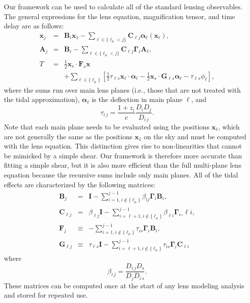 \documentclass{emulateapj}
\newcommand\A[0]{\mathbf{A}}
\newcommand\B[0]{\mathbf{B}}
\newcommand\C[0]{\mathbf{C}}
\newcommand\I[0]{\mathbf{I}}
\newcommand\F[0]{\mathbf{F}}
\newcommand\G[0]{\mathbf{G}}
\newcommand\GammaMat[0]{\boldsymbol{\Gamma}}
\newcommand\x[0]{\mathbf{x}}
\newcommand\al[0]{\boldsymbol{\alpha}}
\begin{document}
Our framework can be used to calculate all of the standard lensing observables. The general expressions for the lens equation, magnification tensor, and time delay are as follows:
\begin{eqnarray}
\x_{j} &=& \B_i \x_1 - \sum_{\ell \in \{\ell_\mu<j\}} \C_{\ell j} \al_\ell(\x_\ell), \label{eqn:lenseqn}\\
\A_{j} &=& \B_i - \sum_{\ell \in \{\ell_\mu<j\}} \C_{\ell j} \GammaMat_\ell \A_\ell, \\
T &=& \frac{1}{2} \x_s \cdot \F_s \x \nonumber \\
&&+ \sum\limits_{\ell \in \{\ell_\mu\}}\left[\frac{1}{2}\tau_{\ell s} \x_\ell \cdot \al_\ell -\frac{1}{2}\x_s \cdot \G_{\ell s}\al_\ell -\tau_{\ell s}\phi_\ell \right],
\end{eqnarray}
where the sums run over main lens planes (i.e., those that are not treated with the tidal approximation), $\al_\ell$ is the deflection in main plane $\ell$, and  
\begin{equation}
\tau_{i\,j} = \frac{ 1 + z_i}{c} \frac{D_i D_j}{D_{i\,j}}.
\end{equation}
Note that each main plane needs to be evaluated using the positions $\x_\ell$, which are not generally the same as the positions $\x_1$ on the sky and must be computed with the lens equation. This distinction gives rise to non-linearities that cannot be mimicked by a simple shear. Our framework is therefore more accurate than fitting a simple shear, but it is also more efficient than the full multi-plane lens equation because the recursive sums include only main planes.  All of the tidal effects are characterized by the following matrices:
\begin{eqnarray}
\B_j &=& \I - \sum\limits_{i=1,i\not \in \{\ell_\mu\}}^{j-1}\beta_{ij}\GammaMat_i \B_i, \\
\C_{\ell j} &=& \beta_{\ell j} \I - \sum\limits_{i=\ell+1, i\not\in\{\ell_\mu\}}^{j-1} \beta_{\ell i}\GammaMat_i\_{\ell i}, \label{eqn:cmatdef}\\
\F_j &\equiv& 
  - \sum\limits_{i=1,i\not \in \{\ell_\mu\}}^{j-1} \tau_{is}\GammaMat_i\B_i, \\
\G_{\ell j}&\equiv& 
 \tau_{\ell s}\I- \sum\limits_{i=\ell+1,i \not \in \{\ell_\mu\}}^{j-1} \tau_{is}\GammaMat_i\C_{\ell i}
\end{eqnarray}
where 
\begin{equation}
\beta_{i\,j} = \frac{D_{i\,j} D_s}{D_{j}D_{i\,s}}.
\end{equation}
These matrices can be computed once at the start of any lens modeling analysis and stored for repeated use.
\end{document}
